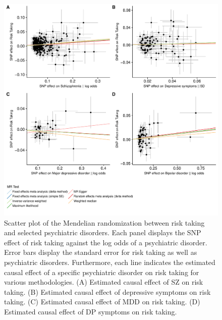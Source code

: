 \begin{figure}[htpb]
  \centering
  \includegraphics[width=0.7\linewidth]{ukb_psychiatric/figures/mr_risk.pdf}
  \caption[Scatter Plot of the Causal Effects on Risk Taking]{
    Scatter plot of the Mendelian randomization between risk taking and selected psychiatric disorders.
    Each panel displays the SNP effect of risk taking against the log odds of a psychiatric disorder.
    Error bars display the standard error for risk taking as well as psychiatric disorders.
    Furthermore, each line indicates the estimated causal effect of a specific psychiatric disorder on risk taking for various methodologies.
    (A) Estimated causal effect of SZ on risk taking.
    (B) Estimated causal effect of depressive symptoms on risk taking.
    (C) Estimated causal effect of MDD on risk taking.
    (D) Estimated causal effect of DP symptoms on risk taking.
  }\label{fig:mr_risk}
\end{figure}

